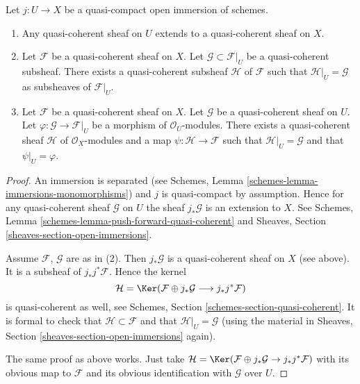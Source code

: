 \begin{lemma}
\label{lemma-extend-trivial}
Let $j : U \to X$ be a quasi-compact open immersion of schemes.
\begin{enumerate}
\item Any quasi-coherent sheaf on $U$ extends to a quasi-coherent
sheaf on $X$.
\item Let $\mathcal{F}$ be a quasi-coherent sheaf on $X$.
Let $\mathcal{G} \subset \mathcal{F}|_U$ be a quasi-coherent
subsheaf. There exists a quasi-coherent subsheaf $\mathcal{H}$ of
$\mathcal{F}$ such that $\mathcal{H}|_U = \mathcal{G}$
as subsheaves of $\mathcal{F}|_U$.
\item Let $\mathcal{F}$ be a quasi-coherent sheaf on $X$.
Let $\mathcal{G}$ be a quasi-coherent sheaf on $U$.
Let $\varphi : \mathcal{G} \to \mathcal{F}|_U$ be a morphism
of $\mathcal{O}_U$-modules. There exists a quasi-coherent sheaf $\mathcal{H}$
of $\mathcal{O}_X$-modules and a map $\psi : \mathcal{H} \to \mathcal{F}$
such that $\mathcal{H}|_U = \mathcal{G}$ and that
$\psi|_U = \varphi$.
\end{enumerate}
\end{lemma}

\begin{proof}
An immersion is separated
(see Schemes, Lemma \ref{schemes-lemma-immersions-monomorphisms})
and $j$ is quasi-compact by assumption.
Hence for any quasi-coherent sheaf $\mathcal{G}$ on $U$ the sheaf
$j_*\mathcal{G}$ is an extension to $X$. See
Schemes, Lemma \ref{schemes-lemma-push-forward-quasi-coherent} and
Sheaves, Section \ref{sheaves-section-open-immersions}.

\medskip\noindent
Assume $\mathcal{F}$, $\mathcal{G}$ are as in (2).
Then $j_*\mathcal{G}$ is a quasi-coherent sheaf on $X$ (see above).
It is a subsheaf of $j_*j^*\mathcal{F}$.
Hence the kernel
$$
\mathcal{H} =
\Ker(\mathcal{F} \oplus j_* \mathcal{G}
\longrightarrow j_*j^*\mathcal{F})
$$
is quasi-coherent as well, see
Schemes, Section \ref{schemes-section-quasi-coherent}.
It is formal to check that $\mathcal{H} \subset \mathcal{F}$ and that
$\mathcal{H}|_U = \mathcal{G}$ (using the material in
Sheaves, Section \ref{sheaves-section-open-immersions} again).

\medskip\noindent
The same proof as above works. Just take
$\mathcal{H} = \Ker(\mathcal{F} \oplus j_* \mathcal{G}
\to j_*j^*\mathcal{F})$ with its obvious map to $\mathcal{F}$
and its obvious identification with $\mathcal{G}$ over $U$.
\end{proof}

